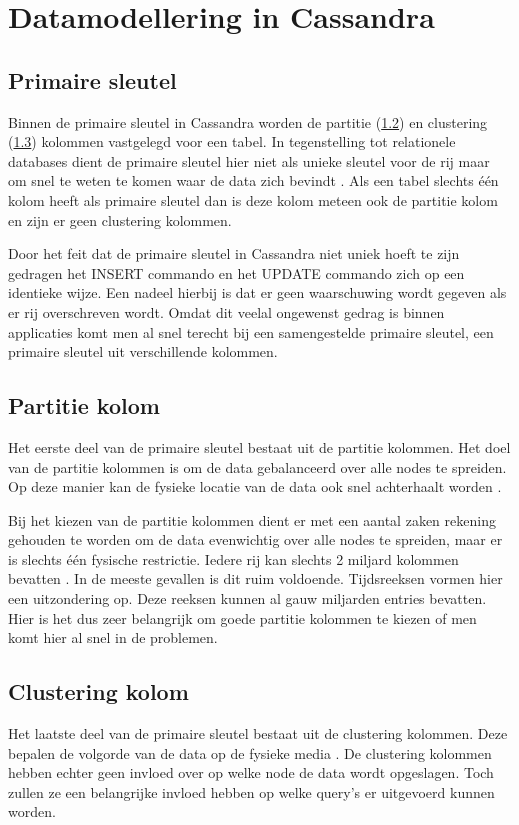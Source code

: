 \chapter{Datamodellering in Cassandra}
\label{ch:cassandra_modelling}
\section{Primaire sleutel}
Binnen de primaire sleutel in Cassandra worden de partitie (\ref{partition_key}) en clustering (\ref{clustering_key}) kolommen vastgelegd voor een tabel.
In tegenstelling tot relationele databases dient de primaire sleutel hier niet als unieke sleutel voor de rij maar om snel te weten te komen waar de data zich bevindt \citep{kan2014cassandra}.
Als een tabel slechts één kolom heeft als primaire sleutel dan is deze kolom meteen ook de partitie kolom en zijn er geen clustering kolommen.

Door het feit dat de primaire sleutel in Cassandra niet uniek hoeft te zijn gedragen het INSERT commando en het UPDATE commando zich op een identieke wijze.
Een nadeel hierbij is dat er geen waarschuwing wordt gegeven als er rij overschreven wordt.
Omdat dit veelal ongewenst gedrag is binnen applicaties komt men al snel terecht bij een samengestelde primaire sleutel, een primaire sleutel uit verschillende kolommen.

\section{Partitie kolom}
\label{partition_key}
Het eerste deel van de primaire sleutel bestaat uit de partitie kolommen.
Het doel van de partitie kolommen is om de data gebalanceerd over alle nodes te spreiden.
Op deze manier kan de fysieke locatie van de data ook snel achterhaalt worden \citep{kan2014cassandra}.

Bij het kiezen van de partitie kolommen dient er met een aantal zaken rekening gehouden te worden om de data evenwichtig over alle nodes te spreiden, maar er is slechts één fysische restrictie.
Iedere rij kan slechts 2 miljard kolommen bevatten \citep{McFadin2013Timeseries}.
In de meeste gevallen is dit ruim voldoende.
Tijdsreeksen vormen hier een uitzondering op.
Deze reeksen kunnen al gauw miljarden entries bevatten.
Hier is het dus zeer belangrijk om  goede partitie kolommen te kiezen of men komt hier al snel in de problemen.

\section{Clustering kolom}
\label{clustering_key}
Het laatste deel van de primaire sleutel bestaat uit de clustering kolommen.
Deze bepalen de volgorde van de data op de fysieke media \citep{strickland2014availability}.
De clustering kolommen hebben echter geen invloed over op welke node de data wordt opgeslagen.
Toch zullen ze een belangrijke invloed hebben op welke query's er uitgevoerd kunnen worden.

